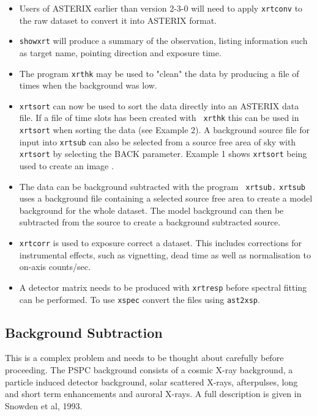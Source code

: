 \documentclass[11pt,fleqn]{article}    %
\begin{document}
\begin{itemize}

\item{Users of ASTERIX earlier than version 2-3-0 will need to apply 
{\tt xrtconv} to the raw dataset to convert it into ASTERIX format.}

\item{{\tt showxrt} will produce a summary of the observation, listing
information such as target name, pointing direction and exposure time.}

\item{The program {\tt xrthk} may be used to "clean" the data by
producing a file of times when the background was low.}

\item{{\tt xrtsort} can now be used to sort the data directly into an
ASTERIX data file.  If a file of time slots has been created with {\tt
xrthk}  this can be used in  {\tt xrtsort} when  sorting the data (see
Example 2).  A background source  file for input into {\tt xrtsub}  can
also be selected from a source free area of sky  with {\tt xrtsort} by
selecting  the BACK parameter.    Example 1 shows {\tt  xrtsort} being
used to create an image} .

\item{The data can be background subtracted with the program {\tt
xrtsub.} {\tt  xrtsub}  uses a  background file containing  a  selected
source free area to create a model background 
for the  whole dataset. The model  background can then be
subtracted from the source to create a background subtracted source.}

\item{{\tt xrtcorr} is used to exposure correct a dataset.  This
includes corrections for instrumental effects, such as vignetting,
dead time as well as normalisation to on-axis counts/sec.}

\item{A detector matrix needs to be produced with {\tt xrtresp} before
spectral fitting can be performed.  To use {\tt xspec} convert the
files using {\tt ast2xsp}.}
\end{itemize}

\subsection{Background Subtraction}
This is a complex problem and needs to be thought about carefully before
proceeding. The PSPC background consists of a cosmic X-ray background,
a particle induced detector background, solar scattered X-rays,
afterpulses, long and short term enhancements and auroral X-rays. 
A full description is given in Snowden et al, 1993.
\end{document}
